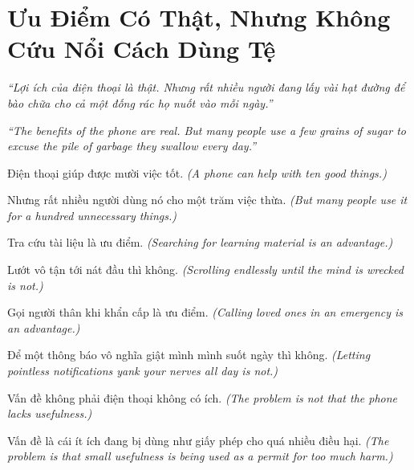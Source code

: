 \chapter{Ưu Điểm Có Thật, Nhưng Không Cứu Nổi Cách Dùng Tệ}

\begin{center}
	\textit{\color{bookprimary}``Lợi ích của điện thoại là thật. Nhưng rất nhiều người đang lấy vài hạt đường để bào chữa cho cả một đống rác họ nuốt vào mỗi ngày.''}

	\textit{\color{bookprimary}``The benefits of the phone are real. But many people use a few grains of sugar to excuse the pile of garbage they swallow every day.''}
\end{center}

\ngancach

\begin{tcolorbox}[colback=booksecondary!8,colframe=booksecondary!40,arc=5pt,title={\bfseries Góc Suy Nghĩ},fonttitle=\bfseries\color{booksecondary}]
Điện thoại giúp được mười việc tốt.
\textit{(A phone can help with ten good things.)}

Nhưng rất nhiều người dùng nó cho một trăm việc thừa.
\textit{(But many people use it for a hundred unnecessary things.)}

Tra cứu tài liệu là ưu điểm.
\textit{(Searching for learning material is an advantage.)}

Lướt vô tận tới nát đầu thì không.
\textit{(Scrolling endlessly until the mind is wrecked is not.)}

Gọi người thân khi khẩn cấp là ưu điểm.
\textit{(Calling loved ones in an emergency is an advantage.)}

Để một thông báo vô nghĩa giật mình mình suốt ngày thì không.
\textit{(Letting pointless notifications yank your nerves all day is not.)}

Vấn đề không phải điện thoại không có ích.
\textit{(The problem is not that the phone lacks usefulness.)}

Vấn đề là cái ít ích đang bị dùng như giấy phép cho quá nhiều điều hại.
\textit{(The problem is that small usefulness is being used as a permit for too much harm.)}
\end{tcolorbox}

